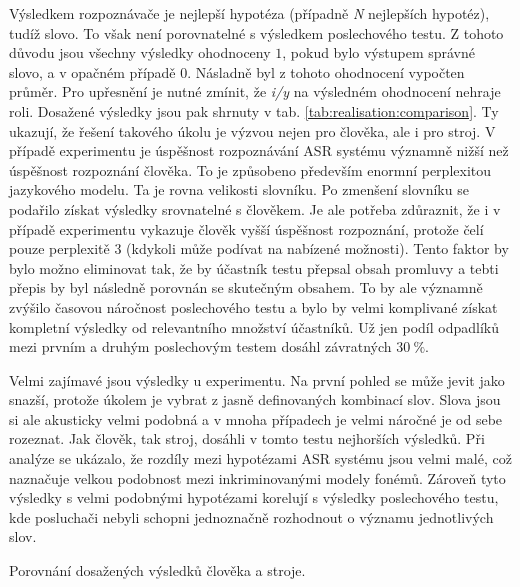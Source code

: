 Výsledkem rozpoznávače je nejlepší hypotéza (případně \textit{N} nejlepších hypotéz), tudíž slovo.
To však není porovnatelné s výsledkem poslechového testu.
Z tohoto důvodu jsou všechny výsledky ohodnoceny $1$, pokud bylo výstupem správné slovo, a v opačném případě $0$.
Násladně byl z tohoto ohodnocení vypočten průměr.
Pro upřesnění je nutné zmínit, že \textit{i/y} na výsledném ohodnocení nehraje roli.
Dosažené výsledky jsou pak shrnuty v tab. \ref{tab:realisation:comparison}.
Ty ukazují, že řešení takového úkolu je výzvou nejen pro člověka, ale i pro stroj.
V případě experimentu  je úspěšnost rozpoznávání ASR systému významně nižší než úspěšnost rozpoznání člověka.
To je způsobeno především enormní perplexitou jazykového modelu.
Ta je rovna velikosti slovníku.
Po zmenšení slovníku se podařilo získat výsledky srovnatelné s člověkem.
Je ale potřeba zdůraznit, že i v případě  experimentu vykazuje člověk vyšší úspěšnost rozpoznání, protože čelí pouze perplexitě $3$ (kdykoli může podívat na nabízené možnosti).
Tento faktor by bylo možno eliminovat tak, že by účastník testu přepsal obsah promluvy a tebti přepis by byl následně porovnán se skutečným obsahem.
To by ale významně zvýšilo časovou náročnost poslechového testu a bylo by velmi komplivané získat kompletní výsledky od relevantního množství účastníků.
Už jen podíl odpadlíků mezi prvním a druhým poslechovým testem dosáhl závratných $30\ \%$.

Velmi zajímavé jsou výsledky u  experimentu.
Na první pohled se může jevit jako snazší, protože úkolem je vybrat z jasně definovaných kombinací slov.
Slova jsou si ale akusticky velmi podobná a v mnoha případech je velmi náročné je od sebe rozeznat.
Jak člověk, tak stroj, dosáhli v tomto testu nejhorších výsledků.
Při analýze se ukázalo, že rozdíly mezi hypotézami ASR systému jsou velmi malé, což naznačuje velkou podobnost mezi inkriminovanými modely fonémů.
Zároveň tyto výsledky s velmi podobnými hypotézami korelují s výsledky poslechového testu, kde posluchači nebyli schopni jednoznačně rozhodnout o významu jednotlivých slov.

\begin{table}[htpb]
  \centering
  \def\arraystretch{1.5}
  \caption{Porovnání dosažených výsledků člověka a stroje.}
  \label{tab:realisation:comparison}
\end{table}

